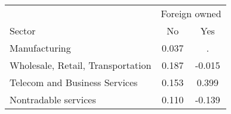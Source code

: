 \begin{tabular}{lcc}
\toprule
 & \multicolumn{2}{c}{Foreign owned} \\
\cmidrule(lr){2-3}
Sector & No & Yes \\
\midrule
Manufacturing & 0.037 & . \\
Wholesale, Retail, Transportation & 0.187 & -0.015 \\
Telecom and Business Services & 0.153 & 0.399 \\
Nontradable services & 0.110 & -0.139 \\
\bottomrule
\end{tabular}
